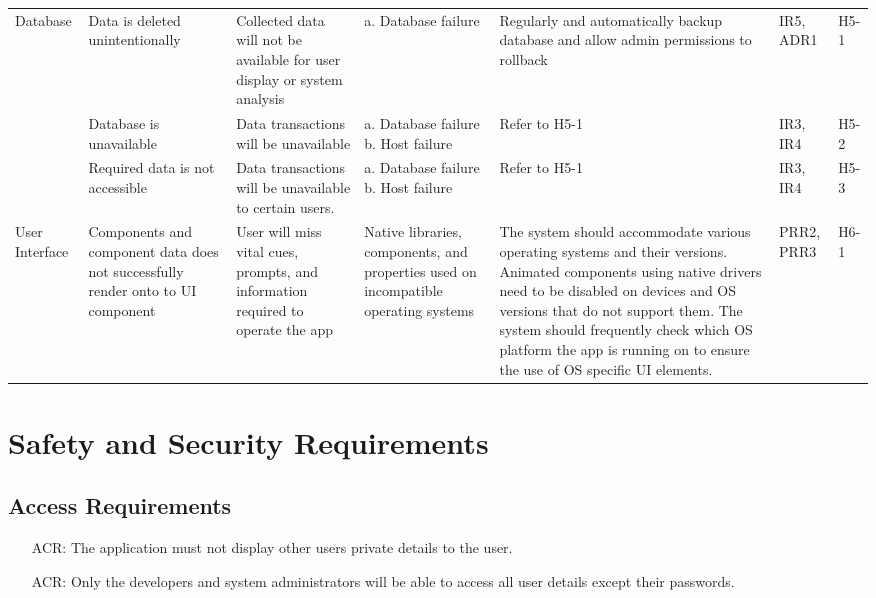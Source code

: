 \documentclass{article}
\newcounter{ACRnum}
\begin{document}
\begin{adjustwidth}{-3cm}{-1cm}
	 \noindent\begin{tabular}{ |p{3.3cm}|p{2.5cm}|p{3.2cm}|p{2cm}|p{2.5cm}|p{1cm}|p{1cm}| @{} }
	\hline
	Database& Data is deleted unintentionally& Collected data will not be available for user display or system analysis& a. Database failure & Regularly and automatically backup database and allow admin permissions to rollback & IR5, ADR1& H5-1\\
	\cline{2-7}
	& Database is unavailable & Data transactions will be unavailable & a. Database failure \newline b. Host failure& Refer to H5-1 & IR3, IR4 & H5-2\\
	\cline{2-7}
	& Required data is not accessible &  Data transactions will be unavailable to certain users. & a. Database failure \newline b. Host failure & Refer to H5-1 & IR3, IR4 &H5-3\\
	\hline
	User Interface & Components and component data does not successfully render onto to UI component & User will miss vital cues, prompts, and information required to operate
	the app & Native libraries, components, and properties used on incompatible operating systems & The system should accommodate various operating systems and
	their versions. Animated components using native drivers need to be disabled on devices and OS versions that do not support them. 
	The system should frequently check which OS platform the app is running on to ensure the use of OS specific UI elements. & PRR2, PRR3 & H6-1\\
	\hline
	\end{tabular}
	\end{adjustwidth}
	\section{Safety and Security Requirements}
	
	\subsection{Access Requirements}
	\noindent 
	\begin{itemize}
		\item[ACR\refstepcounter{ACRnum}\theACRnum:]
		The application must not display other users private details to the user.
		\item[ACR\refstepcounter{ACRnum}\theACRnum:]
		Only the developers and system administrators will be able to access all user details except their passwords.
	\end{itemize}
\end{document}
